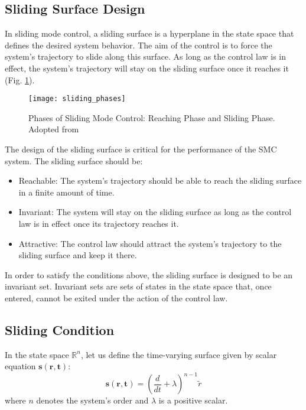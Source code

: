 \subsection{Sliding Surface Design}

    In sliding mode control, a sliding surface is a hyperplane in
    the state space that defines the desired system behavior.
    The aim of the control is to force the system's trajectory to slide
    along this surface. As long as the control law is in effect, 
    the system's trajectory will stay on the sliding surface once it reaches it (Fig. \ref{image:sliding_phases}).

    \begin{figure}[H]
        \centering\texttt{[image: sliding\_phases]}
        \caption{Phases of Sliding Mode Control: Reaching Phase and Sliding Phase. Adopted from \cite{smc_phases}}
        \label{image:sliding_phases}
    \end{figure}

    The design of the sliding surface is critical for the performance of the SMC
    system. The sliding surface should be:
    \begin{itemize}
        \item Reachable: The system's trajectory should be able to reach the sliding
            surface in a finite amount of time.
        \item Invariant: The system will stay on the sliding surface as long as the 
        control law is in effect once its trajectory reaches it.
        \item Attractive: The control law should attract the system's trajectory to the
            sliding surface and keep it there.
    \end{itemize}

    In order to satisfy the conditions above, the sliding surface is designed to be an invariant set.
    Invariant sets are sets of states in the state space that, once entered, cannot be exited under 
    the action of the control law.

    \subsection{Sliding Condition}
    In the state space $\mathbb{R}^n$, let us define the time-varying surface
    given by scalar equation $\mathbf{s(r, t)}$:
    \begin{equation}
        \mathbf{s(r, t)} = (\frac{d}{dt} + \lambda)^{n-1}\tilde{{r}}
    \end{equation}
    where $n$ denotes the system's order and $\lambda$ is a positive scalar.

